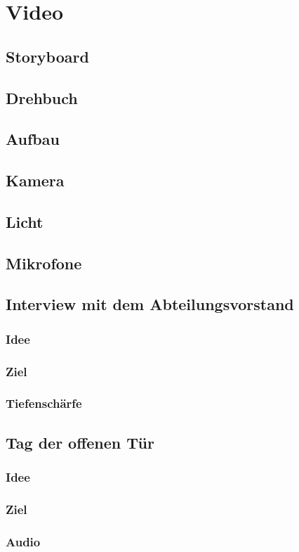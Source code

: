 \section{Video}
\subsection{Storyboard}
\subsection{Drehbuch}
\subsection{Aufbau}
\subsection{Kamera}
\subsection{Licht}
\subsection{Mikrofone}
\subsection{Interview mit dem Abteilungsvorstand}
\subsubsection{Idee}
\subsubsection{Ziel}
\subsubsection{Tiefenschärfe}
\subsection{Tag der offenen Tür}
\subsubsection{Idee}
\subsubsection{Ziel}
\subsubsection{Audio}
